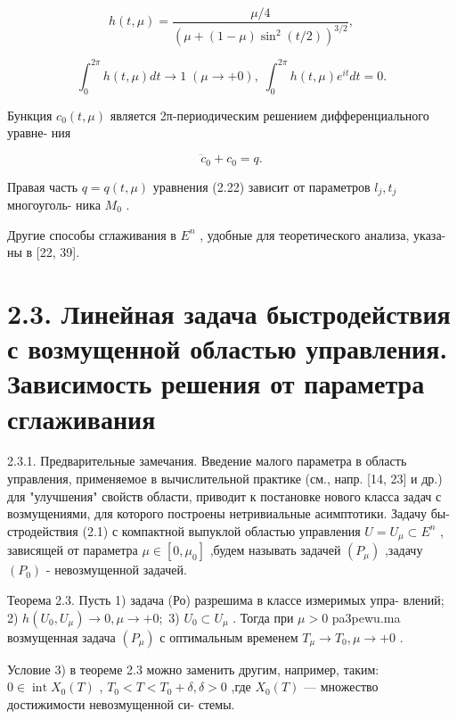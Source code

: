 \documentclass[10pt]{article}
\begin{document}
\[
h\left( {t,\mu }\right)  = \frac{\mu /4}{{\left( \mu  + \left( 1 - \mu \right) {\sin }^{2}\left( t/2\right) \right) }^{3/2}},
\]

\[
{\int }_{0}^{2\pi }h\left( {t,\mu }\right) {dt} \rightarrow  1\;\left( {\mu  \rightarrow   + 0}\right) ,\;{\int }_{0}^{2\pi }h\left( {t,\mu }\right) {e}^{it}{dt} = 0.
\]

Бункция \({c}_{0}\left( {t,\mu }\right)\) является 2π-периодическим решением дифференциального уравне- ния

\[
{\ddot{c}}_{0} + {c}_{0} = q. \tag{2.22}
\]

Правая часть \(q = q\left( {t,\mu }\right)\) уравнения (2.22) зависит от параметров \({l}_{j},{t}_{j}\) многоуголь- ника \({M}_{0}\) .

Другие способы сглаживания в \({E}^{n}\) , удобные для теоретического анализа, указа- ны в [22, 39].

\section*{2.3. Линейная задача быстродействия с возмущенной областью управления. Зависимость решения от параметра сглаживания}

2.3.1. Предварительные замечания. Введение малого параметра в область управления, применяемое в вычислительной практике (см., напр. [14, 23] и др.) для "улучшения" свойств области, приводит к постановке нового класса задач с возмущениями, для которого построены нетривиальные асимптотики. Задачу бы- стродействия (2.1) с компактной выпуклой областью управления \(U = {U}_{\mu } \subset  {E}^{n}\) , зависящей от параметра \(\mu  \in  \left[  {0,{\mu }_{0}}\right]\) ,будем называть задачей \(\left( {P}_{\mu }\right)\) ,задачу \(\left( {P}_{0}\right)\) - невозмущенной задачей.

Теорема 2.3. Пусть 1) задача (Ро) разрешима в классе измеримых упра- влений; 2) \(h\left( {{U}_{0},{U}_{\mu }}\right)  \rightarrow  0,\mu  \rightarrow   + 0;\) 3) \({U}_{0} \subset  {U}_{\mu }\) . Тогда при \(\mu  > 0\) pa3pewu.ma возмущенная задача \(\left( {P}_{\mu }\right)\) с оптимальным временем \({T}_{\mu } \rightarrow  {T}_{0},\mu  \rightarrow   + 0\) .

Условие 3) в теореме 2.3 можно заменить другим, например, таким: \(0 \in  \operatorname{int}{X}_{0}\left( T\right)\) , \({T}_{0} < T < {T}_{0} + \delta ,\delta  > 0\) ,где \({X}_{0}\left( T\right)\) — множество достижимости невозмущенной си- стемы.
\end{document}
